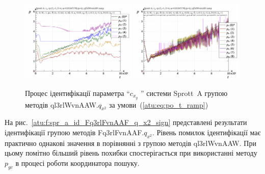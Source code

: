 \begin{figure}[htb!]
  \centerline{
    \includegraphics[width=0.49\textwidth]{p/cha/spr_a/ql3rlWvnAAW_x2/sprott_a_id-p_t_pi_ql3rlWvnAAW_ramp.png}
    \hfill
    \includegraphics[width=0.49\textwidth]{p/cha/spr_a/ql3rlWvnAAW_x2/sprott_a_id-p_t_p_ql3rlWvnAAW_ramp.png}
  }
\caption{Процес ідентифікації параметра ``$ c_{x_y} $ '' системи Sprott~A групою методів ql3rlWvnAAW.$q_{x^2} $ за умови~(\ref{atu:eq:po_t_ramp})}
  \label{atu:f:spr_a_id_ql3rlWvnAAW_q_x2_ramp}
\end{figure}

На рис.~\ref{atu:f:spr_a_id_Fq3rlFvnAAF_q_x2_sign} представлені результати
ідентифікації групою методів Fq3rlFvnAAF.$q_{x^2} $. Рівень помилок ідентифікації має практично однакові
значення в порівнянні з групою методів ql3rlWvnAAW. При цьому помітно
більший рівень похибки спостерігається при використанні методу
$ p_{gc} $ в процесі роботи координатора пошуку.


